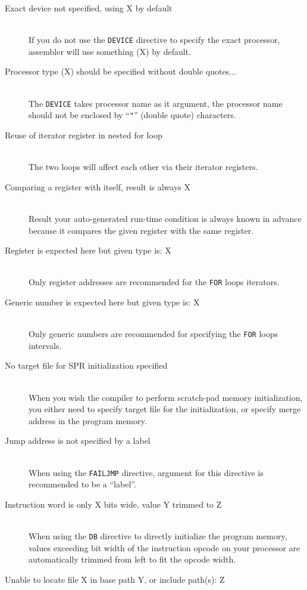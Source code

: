 \begin{description}
        \item[Exact device not specified, using X by default]~\\
            If you do not use the \texttt{DEVICE} directive to specify the exact processor, assembler will use something (X) by default.
        \item[Processor type (X) should be specified without double quotes...]~\\
            The \texttt{DEVICE} takes processor name as it argument, the processor name should not be enclosed by ``\texttt{"}'' (double quote) characters.
        \item[Reuse of iterator register in nested for loop]~\\
            The two loops will affect each other via their iterator registers.
        \item[Comparing a register with itself, result is always X]~\\
            Result your auto-generated run-time condition is always known in advance because it compares the given register with the same register.
        \item[Register is expected here but given type is: X]~\\
            Only register addresses are recommended for the \texttt{FOR} loops iterators.
        \item[Generic number is expected here but given type is: X]~\\
            Only generic numbers are recommended for specifying the \texttt{FOR} loops intervals.
        \item[No target file for SPR initialization specified]~\\
            When you wish the compiler to perform scratch-pad memory initialization, you either need to specify target file for the initialization, or specify merge address in the program memory.
        \item[Jump address is not specified by a label]~\\
            When using the \texttt{FAILJMP} directive, argument for this directive is recommended to be a ``label''.
        \item[Instruction word is only X bits wide, value Y trimmed to Z]~\\
            When using the \texttt{DB} directive to directly initialize the program memory, values exceeding bit width of the instruction opcode on your processor are automatically trimmed from left to fit the opcode width.
        \item[Unable to locate file X in base path Y, or include path(s): Z]~\\

\end{description}
